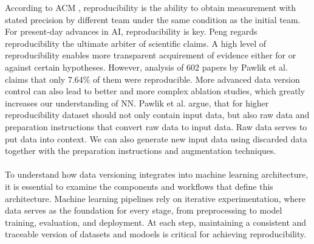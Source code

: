 According to ACM \cite{ACMreproducibility}, reproducibility is the ability to
obtain measurement with stated precision by different team under the same
condition as the initial team. For present-day advances in AI, reproducibility
is key. Peng \cite{peng2011reproducible} regards reproducibility the ultimate
arbiter of scientific claims. A high level of reproducibility enables more
transparent acquirement of evidence either for or against certain hypotheses.
However, analysis of 602 papers by Pawlik et al.\cite{pawlik2019link} claims
that only 7.64\% of them were reproducible. More advanced data version control
can also lead to better and more complex ablation studies, which greatly
increases our understanding of NN. Pawlik et al. \cite{pawlik2019link} argue,
that for higher reproducibility dataset should not only contain input data, but
also raw data and preparation instructions that convert raw data to input data.
Raw data serves to put data into context. We can also generate new input data
using discarded data together with the preparation instructions and augmentation
techniques.
\\\\
To understand how data versioning integrates into machine learning architecture, 
it is essential to examine the components and workflows that define this 
architecture. Machine learning pipelines rely on iterative experimentation, 
where data serves as the foundation for every stage, from preprocessing to model 
training, evaluation, and deployment. At each step, maintaining a consistent and 
traceable version of datasets and modoels is critical for achieving 
reproducibility. \cite{wandb}


\begin{comment}
As stated by Komsiyski \cite{komsiyski2013binary}, storing multiple
versions of binary files can be expensive.

criteria according to perez et al.
More recently, a trend has started to mint DOIs for other types of scientific
products such as datasets [12] and training materials (for example [13]). A key
motivation for this is to build a framework for giving scientists broader credit
for their work [14,15] while simultaneously supporting clearer, more persistent
ways to cite and track it. Helping to drive this change are funding agencies
such as the National Institutes of Health (NIH) and National Science Foundation
(NSF) in the United States and Research Councils in the United Kingdom, which
are increasingly recognizing the importance of research products such as
publicly available datasets and software. \cite{perez2016ten}
\end{comment}